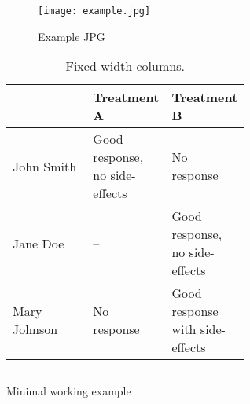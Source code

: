 \begin{figure}
    \centering
    \texttt{[image: example.jpg]}
    \caption{Example JPG}%
    \label{fig:example}
\end{figure}

\begin{table}[ht]
    \centering
    \caption{Fixed-width columns.}%
    \label{tab:example}
    \begin{tabular}[t]{l>{\raggedright}p{0.3\linewidth}>{\raggedright\arraybackslash}p{0.3\linewidth}}
        \toprule
                     & Treatment A                    & Treatment B                     \\
        \midrule
        John Smith   & Good response, no side-effects & No response                     \\
        Jane Doe     & --                             & Good response, no side-effects  \\
        Mary Johnson & No response                    & Good response with side-effects \\
        \bottomrule
    \end{tabular}
\end{table}%



\begin{listing}[ht]
    \inputminted{python}{code/example.py}
    \caption{Minimal working example}
    \label{listing:1}
\end{listing}


